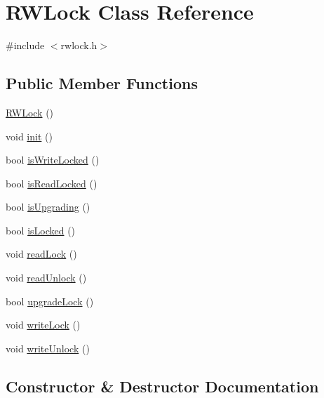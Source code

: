 \hypertarget{classRWLock}{}\section{R\+W\+Lock Class Reference}
\label{classRWLock}


{\ttfamily \#include $<$rwlock.\+h$>$}

\subsection*{Public Member Functions}
\begin{DoxyCompactItemize}
\item 
\hyperlink{classRWLock_ad584ecc0f762d79a55672c0a280fac3e}{R\+W\+Lock} ()
\item 
void \hyperlink{classRWLock_a86bb2cfffb42fa153968313033e84c7a}{init} ()
\item 
bool \hyperlink{classRWLock_a66fb3ab26aba574bd7bdc3601f48e58f}{is\+Write\+Locked} ()
\item 
bool \hyperlink{classRWLock_ad8cee8ddb2215d3b614bfe4e1f9532a1}{is\+Read\+Locked} ()
\item 
bool \hyperlink{classRWLock_afebbcc3ec51f82d54e45803134ecfaa1}{is\+Upgrading} ()
\item 
bool \hyperlink{classRWLock_a19701f284ca1362468c6571f1bb606b4}{is\+Locked} ()
\item 
void \hyperlink{classRWLock_ac1a8814594b39358b3fc15552903963c}{read\+Lock} ()
\item 
void \hyperlink{classRWLock_a0f24f87d56d88c5449d3eb9ab3c6c8be}{read\+Unlock} ()
\item 
bool \hyperlink{classRWLock_a5ac47c287ea985c1ac0df8feac4eb089}{upgrade\+Lock} ()
\item 
void \hyperlink{classRWLock_a64b83c3c0cff22d9d3512daaeacc7bfb}{write\+Lock} ()
\item 
void \hyperlink{classRWLock_a3c735ecb40882e9c4c3b7f8419692bad}{write\+Unlock} ()
\end{DoxyCompactItemize}


\subsection{Constructor \& Destructor Documentation}
\mbox{\label{classRWLock_ad584ecc0f762d79a55672c0a280fac3e}} 

